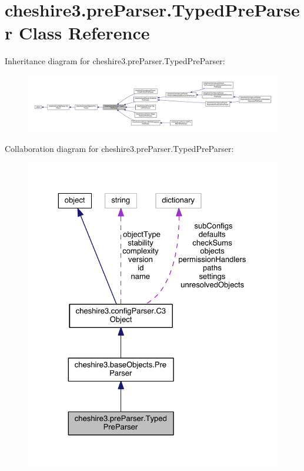 \hypertarget{classcheshire3_1_1pre_parser_1_1_typed_pre_parser}{\section{cheshire3.\-pre\-Parser.\-Typed\-Pre\-Parser Class Reference}
\label{classcheshire3_1_1pre_parser_1_1_typed_pre_parser}
}


Inheritance diagram for cheshire3.\-pre\-Parser.\-Typed\-Pre\-Parser\-:
\nopagebreak
\begin{figure}[H]
\begin{center}
\leavevmode
\includegraphics[width=350pt]{classcheshire3_1_1pre_parser_1_1_typed_pre_parser__inherit__graph}
\end{center}
\end{figure}


Collaboration diagram for cheshire3.\-pre\-Parser.\-Typed\-Pre\-Parser\-:
\nopagebreak
\begin{figure}[H]
\begin{center}
\leavevmode
\includegraphics[width=325pt]{classcheshire3_1_1pre_parser_1_1_typed_pre_parser__coll__graph}
\end{center}
\end{figure}
